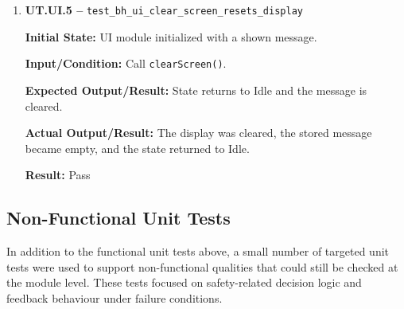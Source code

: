 \documentclass[12pt]{article}
\begin{document}
\begin{enumerate}
    \textbf{Expected Output/Result:} The prompt path returns the
    expected user response.
    
    \textbf{Actual Output/Result:} The mocked prompt returned the
    expected response and the UI stayed consistent with the prompt
    flow.
    
    \textbf{Result:} Pass
    
    \item \textbf{UT.UI.5 --}
    \texttt{test\_bh\_ui\_clear\_screen\_resets\_display}
    
    \textbf{Initial State:} UI module initialized with a shown
    message.
    
    \textbf{Input/Condition:} Call \texttt{clearScreen()}.
    
    \textbf{Expected Output/Result:} State returns to Idle and the
    message is cleared.
    
    \textbf{Actual Output/Result:} The display was cleared, the stored
    message became empty, and the state returned to Idle.
    
    \textbf{Result:} Pass
\end{enumerate}

\subsection{Non-Functional Unit Tests}

In addition to the functional unit tests above, a small number of
targeted unit tests were used to support non-functional qualities that
could still be checked at the module level. These tests focused on
safety-related decision logic and feedback behaviour under failure
conditions.
\end{document}
